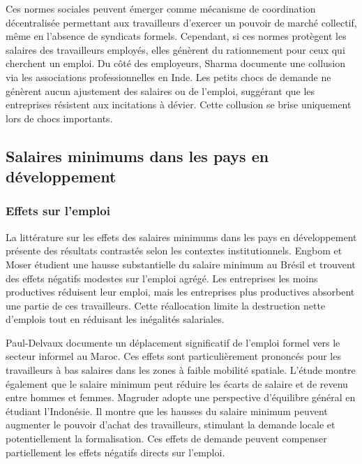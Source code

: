 \documentclass[12pt,a4paper]{article}
\begin{document}
Ces normes sociales peuvent émerger comme mécanisme de coordination décentralisée permettant aux travailleurs d'exercer un pouvoir de marché collectif, même en l'absence de syndicats formels. Cependant, si ces normes protègent les salaires des travailleurs employés, elles génèrent du rationnement pour ceux qui cherchent un emploi. Du côté des employeurs, Sharma \citeyearpar{sharma2024} documente une collusion via les associations professionnelles en Inde. Les petits chocs de demande ne génèrent aucun ajustement des salaires ou de l'emploi, suggérant que les entreprises résistent aux incitations à dévier. Cette collusion se brise uniquement lors de chocs importants.

\subsection{Salaires minimums dans les pays en développement}

\subsubsection{Effets sur l'emploi}

La littérature sur les effets des salaires minimums dans les pays en développement présente des résultats contrastés selon les contextes institutionnels. Engbom et Moser \citeyearpar{engbom2022} étudient une hausse substantielle du salaire minimum au Brésil et trouvent des effets négatifs modestes sur l'emploi agrégé. Les entreprises les moins productives réduisent leur emploi, mais les entreprises plus productives absorbent une partie de ces travailleurs. Cette réallocation limite la destruction nette d'emplois tout en réduisant les inégalités salariales.

Paul-Delvaux \citeyearpar{pauldelvaux2024} documente un déplacement significatif de l'emploi formel vers le secteur informel au Maroc. Ces effets sont particulièrement prononcés pour les travailleurs à bas salaires dans les zones à faible mobilité spatiale. L'étude montre également que le salaire minimum peut réduire les écarts de salaire et de revenu entre hommes et femmes. Magruder \citeyearpar{magruder2013} adopte une perspective d'équilibre général en étudiant l'Indonésie. Il montre que les hausses du salaire minimum peuvent augmenter le pouvoir d'achat des travailleurs, stimulant la demande locale et potentiellement la formalisation. Ces effets de demande peuvent compenser partiellement les effets négatifs directs sur l'emploi.
\end{document}
